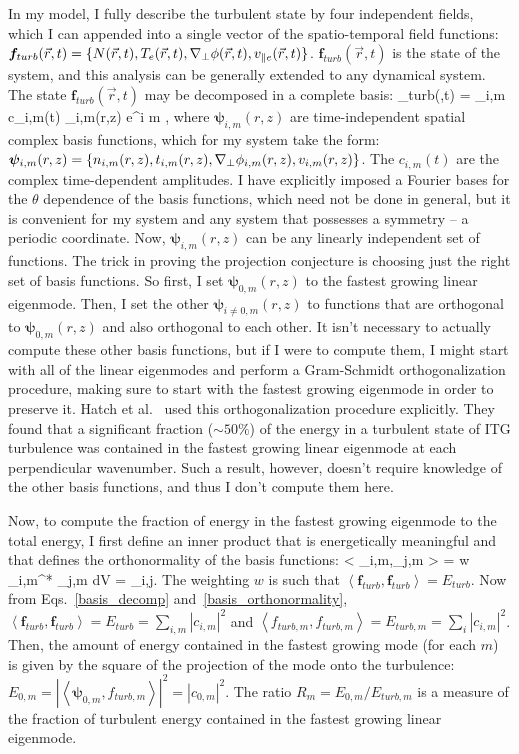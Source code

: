 In my model, I fully describe the turbulent state by four independent fields, which I can appended into a single vector of the spatio-temporal field functions: 
$\bm{f}_{turb}(\vec{r},t) = \{N(\vec{r},t),T_e(\vec{r},t),\nabla_\perp \phi(\vec{r},t), v_{\parallel e}(\vec{r},t)\}$. $\bm{f}_{turb}(\vec{r},t)$ is the state of the system, and this analysis can be generally extended 
to any dynamical system. The state $\bm{f}_{turb}(\vec{r},t)$ may be decomposed in a complete basis:
\beq
\label{basis_decomp}
_{turb}(,t) = \sum_{i,m} c_{i,m}(t) \bm{\psi}_{i,m}(r,z) e^{i m \theta},
\eeq
where $\bm{\psi}_{i,m}(r,z)$ are time-independent spatial complex basis functions, which for my system take the form:
$\bm{\psi}_{i,m}(r,z) = \left\{ n_{i,m}(r,z),t_{i,m}(r,z),\nabla_\perp \phi_{i,m}(r,z), v_{i,m}(r,z) \right\}$.
The $c_{i,m}(t)$ are the complex time-dependent amplitudes. I have explicitly imposed a Fourier bases for the $\theta$ dependence of the basis functions, which need not be done in general, but it
is convenient for my system and any system that possesses a symmetry -- a periodic coordinate. 
Now, $\bm{\psi}_{i,m}(r,z)$ can be any linearly independent set of functions. The trick in proving the projection conjecture is choosing just the right set of basis functions.
So first, I set $\bm{\psi}_{0,m}(r,z)$ to the fastest growing linear eigenmode. Then, I set the other $\bm{\psi}_{i \ne 0,m}(r,z)$ to functions that are orthogonal to $\bm{\psi}_{0,m}(r,z)$ and
also orthogonal to each other. It isn't necessary to actually compute these other basis functions, but if I were to compute them, I might start with all of the linear eigenmodes
and perform a Gram-Schmidt orthogonalization procedure, making sure to start with the fastest growing eigenmode in order to preserve it. Hatch et al.~\cite{hatch2011} used this orthogonalization
procedure explicitly. They found that a significant fraction ($\sim 50\%$) of the energy in a turbulent state of ITG turbulence was contained in the fastest growing linear eigenmode 
at each perpendicular wavenumber. Such a result, however, doesn't require knowledge of the other basis functions, and thus I don't compute them here.

Now, to compute the fraction of energy in the fastest growing eigenmode to the total energy, 
I first define an inner product that is energetically meaningful and that defines the orthonormality of the basis functions:
\beq
\label{basis_orthonormality}
\left< \bm{\psi}_{i,m},\bm{\psi}_{j,m} \right> = \int w \bm{\psi}_{i,m}^* \cdot \bm{\psi}_{j,m} dV = \delta_{i,j}.
\eeq
The weighting $w$ is such that $\left< \bm{f}_{turb}, \bm{f}_{turb} \right> = E_{turb}$.
Now from Eqs.~\ref{basis_decomp} and~\ref{basis_orthonormality}, $\left< \bm{f}_{turb}, \bm{f}_{turb} \right> = E_{turb} = \sum_{i,m} |c_{i,m}|^2$ and 
$\left< f_{turb,m}, f_{turb,m} \right> = E_{turb,m} = \sum_i |c_{i,m}|^2$.
Then, the amount of energy contained in the fastest growing mode (for each $m$) is given by the square of the projection
of the mode onto the turbulence: $E_{0,m} = \left| \left< \bm{\psi}_{0,m}, f_{turb,m} \right> \right|^2 = |c_{0,m}|^2$. The ratio 
$R_m = E_{0,m}/E_{turb,m}$ is a measure of the fraction of turbulent energy contained in the fastest growing linear eigenmode. 

